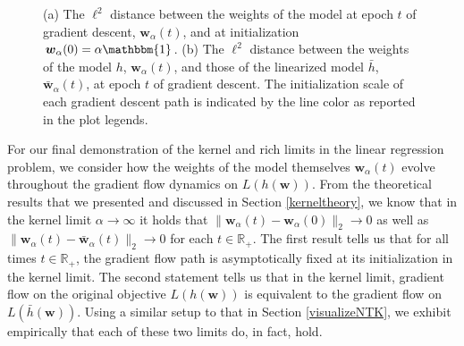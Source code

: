 \documentclass{article}
\begin{document}
\begin{figure}[H]
    \centering
    \hfill
    \caption{(a) The $\ell^2$ distance between the weights of the model at epoch $t$ of gradient descent, $\boldsymbol{w}_{\alpha}(t)$, and at initialization $\boldsymbol{w}_{\alpha}(0) = \alpha \mathbbm{1}$. (b) The $\ell^2$ distance between the weights of the model $h$, $\boldsymbol{w}_{\alpha}(t)$, and those of the linearized model $\bar{h}$, $\boldsymbol{\bar{w}}_{\alpha}(t)$, at epoch $t$ of gradient descent. The initialization scale of each gradient descent path is indicated by the line color as reported in the plot legends.}\label{fig:weights}
\end{figure}

For our final demonstration of the kernel and rich limits in the linear regression problem, we consider how the weights of the model themselves $\boldsymbol{w}_{\alpha}(t)$ evolve throughout the gradient flow dynamics on $L(h(\boldsymbol{w}))$. From the theoretical results that we presented and discussed in Section \ref{kerneltheory}, we know that in the kernel limit $\alpha \rightarrow \infty$ it holds that $\| \boldsymbol{w}_{\alpha}(t) -  \boldsymbol{w}_{\alpha}(0) \|_2 \rightarrow 0$ as well as $\| \boldsymbol{w}_{\alpha}(t) -  \boldsymbol{\bar{w}}_{\alpha}(t) \|_2 \rightarrow 0$ for each $t \in \mathbb{R}_+$. The first result tells us that for all times $t \in \mathbb{R}_+$, the gradient flow path is asymptotically fixed at its initialization in the kernel limit. The second statement tells us that in the kernel limit, gradient flow on the original objective $L(h(\boldsymbol{w}))$ is equivalent to the gradient flow on $L(\bar{h}(\boldsymbol{w}))$. Using a similar setup to that in Section \ref{visualizeNTK}, we exhibit empirically that each of these two limits do, in fact, hold.
\end{document}
